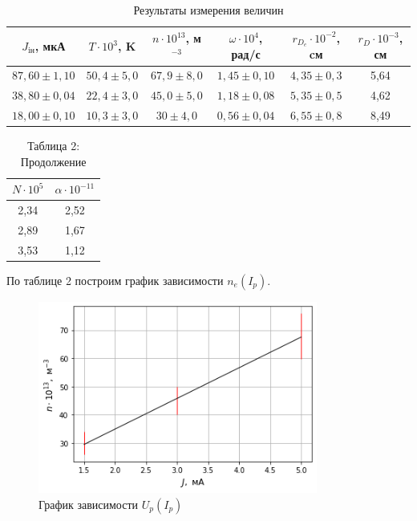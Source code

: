 \documentclass[a4paper]{article}
\theoremstyle{definition}
\theoremstyle{remark}
\begin{document}
        \begin{table}[h!]
            \centering
            \caption{Результаты измерения величин}
            \begin{tabular}{|c|c|c|c|c|c|}
            \hline
            \multicolumn{1}{|c|}{$J_{\text{iн}}$, мкА} & $T\cdot 10^3$, K & $n \cdot 10^13$, м$^{-3}$ & $\omega \cdot 10^4$, рад/с & $r_{D_{e}}\cdot 10^{-2}$, cм & $r_{D} \cdot 10^{-3}$, см \\ \hline
            $87,60 \pm 1,10$                           & $50,4 \pm 5,0$   & $67,9 \pm 8,0$            & $1,45 \pm 0,10$            & $4,35 \pm 0,3$               & 5,64                      \\ \hline
            $38,80 \pm 0,04$                           & $22,4 \pm 3,0$   & $45,0 \pm 5,0$            & $1,18 \pm 0,08$            & $5,35 \pm 0,5$               & 4,62                      \\ \hline
            $18,00 \pm 0,10$                           & $10,3 \pm 3,0$   & $30 \pm 4,0$              & $0,56 \pm 0,04$            & $6,55 \pm 0,8$               & 8,49                      \\ \hline
            \end{tabular}
            \end{table}

            \newpage

            \begin{table}[t!]
                \centering
                \caption*{Таблица 2: Продолжение}
                \begin{tabular}{|c|c|}
                \hline
                $N \cdot 10^5$ & $\alpha \cdot 10^{-11}$ \\ \hline
                2,34           & 2,52                    \\ \hline
                2,89           & 1,67                    \\ \hline
                3,53           & 1,12                    \\ \hline
                \end{tabular}
                \end{table}

            По таблице 2 построим график зависимости $n_e(I_p)$.

            \begin{figure}[h!]
                \centering
                \includegraphics[width = 260pt]{image/graphlast.png}
                \caption{График зависимости $U_p(I_p)$}
            \end{figure}
\end{document}
